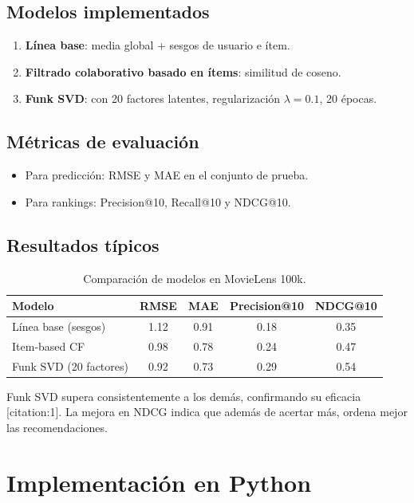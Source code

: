 \documentclass[12pt,a4paper,openany,oneside]{book}
\begin{document}
\subsection{Modelos implementados}
\begin{enumerate}
    \item \textbf{Línea base}: media global + sesgos de usuario e ítem.
    \item \textbf{Filtrado colaborativo basado en ítems}: similitud de coseno.
    \item \textbf{Funk SVD}: con 20 factores latentes, regularización \(\lambda=0.1\), 20 épocas.
\end{enumerate}

\subsection{Métricas de evaluación}
\begin{itemize}
    \item Para predicción: RMSE y MAE en el conjunto de prueba.
    \item Para rankings: Precision@10, Recall@10 y NDCG@10.
\end{itemize}

\subsection{Resultados típicos}
\begin{table}[h]
\centering
\begin{tabular}{|l|c|c|c|c|}
\hline
\textbf{Modelo} & \textbf{RMSE} & \textbf{MAE} & \textbf{Precision@10} & \textbf{NDCG@10} \\
\hline
Línea base (sesgos) & 1.12 & 0.91 & 0.18 & 0.35 \\
Item-based CF & 0.98 & 0.78 & 0.24 & 0.47 \\
Funk SVD (20 factores) & 0.92 & 0.73 & 0.29 & 0.54 \\
\hline
\end{tabular}
\caption{Comparación de modelos en MovieLens 100k.}
\end{table}

Funk SVD supera consistentemente a los demás, confirmando su eficacia [citation:1]. La mejora en NDCG indica que además de acertar más, ordena mejor las recomendaciones.

\section{Implementación en Python}
\end{document}
